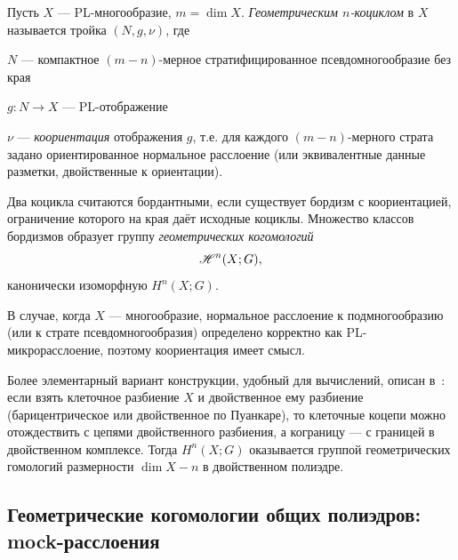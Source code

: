 \documentclass[12pt, twoside]{article}
\begin{document}
\begin{definition}\label{def:geomcocycle}
Пусть $X$ --- PL-многообразие, $m = \dim X$. \emph{Геометрическим $n$-коциклом} в $X$ называется тройка $(N, g, \nu)$, где
\begin{inumerate}
\item $N$ --- компактное $(m-n)$-мерное стратифицированное псевдомногообразие без края
\item $g : N \to X$ --- PL-отображение
\item $\nu$ --- \emph{коориентация} отображения $g$, т.е. для каждого $(m-n)$-мерного страта задано ориентированное нормальное расслоение (или эквивалентные данные разметки, двойственные к ориентации).
\end{inumerate}
Два коцикла считаются бордантными, если существует бордизм с коориентацией, ограничение которого на края даёт исходные коциклы. Множество классов бордизмов образует группу \emph{геометрических когомологий}
\begin{equation}\label{eq:geomcocycle}
\mathscr{H}^n(X;G),
\end{equation}
канонически изоморфную $H^n(X;G)$.
\end{definition}

\begin{remark}
В случае, когда $X$ --- многообразие, нормальное расслоение к подмногообразию (или к страте псевдомногообразия) определено корректно как PL-микрорасслоение, поэтому коориентация имеет смысл.\footnotemark
\end{remark}

\begin{remark}
Более элементарный вариант конструкции, удобный для вычислений, описан в~\cite{Fenn}: если взять клеточное разбиение $X$ и двойственное ему разбиение (барицентрическое или двойственное по Пуанкаре), то клеточные коцепи можно отождествить с цепями двойственного разбиения, а кограницу --- с границей в двойственном комплексе. Тогда $H^n(X;G)$ оказывается группой геометрических гомологий размерности $\dim X - n$ в двойственном полиэдре.\footnotemark
\end{remark}

\subsection{Геометрические когомологии общих полиэдров: mock-расслоения}
\end{document}
